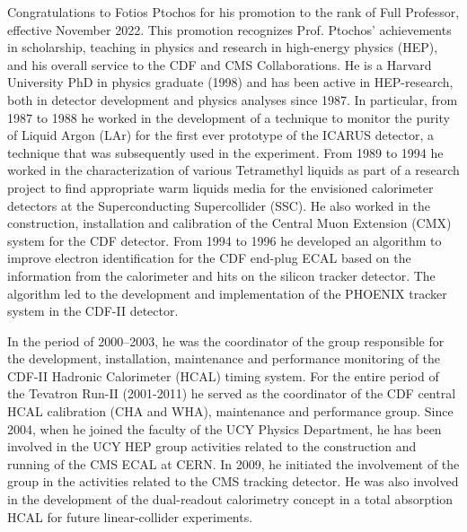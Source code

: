   \begin{multimuons-2}[enhanced, tikz={rotate=0}]{}
  \begin{multicols*}{3}
    Congratulations to Fotios Ptochos for his promotion to the rank of
    Full Professor, effective November 2022. This promotion recognizes
    Prof. Ptochos' achievements in scholarship, teaching in physics and research in
    high-energy physics (HEP), and his overall service to the CDF and CMS
    Collaborations. He is a Harvard University PhD in physics
    graduate (1998) and has been active in HEP-research, both in detector
    development and physics analyses since 1987. In particular, from 1987
    to 1988 he worked in the development of a technique to monitor the
    purity of Liquid Argon (LAr) for the first ever prototype of the
    ICARUS detector, a technique that was subsequently used in the
    experiment. From 1989 to 1994 he worked in the characterization of
    various Tetramethyl liquids as part of a research project to find
    appropriate warm liquids media for the envisioned calorimeter
    detectors at the Superconducting Supercollider (SSC). He also
    worked in the construction, installation and 
    calibration of the Central Muon Extension (CMX) system for the CDF
    detector. From 1994 to 1996 he developed an algorithm to improve
    electron identification for the CDF end-plug ECAL based on the
    information from the calorimeter and hits on the silicon tracker
    detector. The algorithm led to the development and implementation of
    the PHOENIX tracker system in the CDF-II detector. 
    
    In the period of 2000–2003, he was the coordinator of the group
    responsible for the development, installation, maintenance and
    performance monitoring of the CDF-II Hadronic Calorimeter (HCAL)
    timing system. For the entire period of the Tevatron Run-II
    (2001-2011) he served as the coordinator of the CDF central HCAL
    calibration (CHA and WHA), maintenance and performance group. Since
    2004, when he joined the faculty of the UCY Physics Department, he has
    been involved in the UCY HEP group activities related to the
    construction and running of the CMS ECAL at CERN. In 2009, he
    initiated the involvement of the group in the activities related to
    the CMS tracking detector. He was also involved in the development of
    the dual-readout calorimetry concept in a total absorption HCAL for
    future linear-collider experiments. 
    \columnbreak


\end{multicols*}
\end{multimuons-2}
